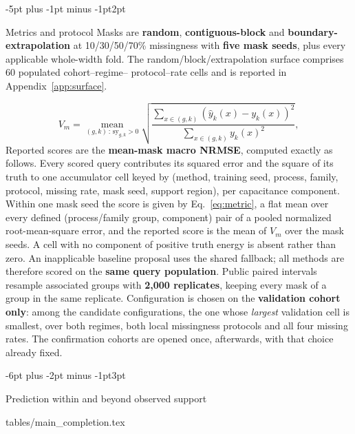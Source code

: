 \documentclass{article}
\makeatletter
\renewcommand{\subsection}{\@startsection{subsection}{2}{\z@}
  {-6pt plus -2pt minus -1pt}{3pt}{\normalsize\sc\raggedright}}
\renewcommand{\subsubsection}{\@startsection{subsubsection}{3}{\z@}
  {-5pt plus -1pt minus -1pt}{2pt}{\normalsize\sc\raggedright}}
\newcommand{\tabdir}{tables}
\newcommand{\tableinput}[1]{\@@input \tabdir/#1 }
\makeatother
\begin{document}
\subsubsection{Metrics and protocol}
\label{sec:metrics}
Masks are \textbf{random}, \textbf{contiguous-block} and \textbf{boundary-extrapolation} at 10/30/50/70\%
missingness with \textbf{five mask seeds}, plus every applicable whole-width fold. The
random/block/extrapolation surface comprises 60 populated cohort--regime--
protocol--rate cells and is reported in Appendix~\ref{app:surface}.

\begin{equation}
\label{eq:metric}
V_m = \operatorname*{mean}_{(g,k)\,:\,\mathrm{sy}_{g,k} > 0}
\sqrt{\frac{\sum_{x \in (g,k)} (\hat y_k(x) - y_k(x))^2}
            {\sum_{x \in (g,k)} y_k(x)^2}},
\end{equation}
Reported scores are the \textbf{mean-mask macro NRMSE}, computed exactly as follows.
Every scored query contributes its squared error and the square of its truth to
one accumulator cell keyed by (method, training seed, process, family, protocol,
missing rate, mask seed, support region), per capacitance component. Within one
mask seed the score is given by Eq.~\eqref{eq:metric},
a flat mean over every defined (process/family group, component) pair of a
pooled normalized root-mean-square error, and the reported score is the mean of
$V_m$ over the mask seeds. A cell with no component of positive truth energy is
absent rather than zero. An inapplicable baseline proposal uses the shared fallback; all methods
are therefore scored on the \textbf{same query population}. Public paired intervals resample associated
groups with \textbf{2{,}000 replicates}, keeping every mask of a group in the same
replicate.
Configuration is chosen on the \textbf{validation cohort only}: among the candidate
configurations, the one whose \emph{largest} validation cell is smallest, over
both regimes, both local missingness protocols and all four missing rates. The
confirmation cohorts are opened once, afterwards, with that choice already
fixed.

\subsection{Prediction within and beyond observed support}
\label{sec:intable}
\label{sec:outtable}

\begin{table}[t]
\centering
\caption{\textbf{Capacitance prediction at 30\% missingness.}
Mean-mask macro NRMSE ($\downarrow$); bold: best method.
CMI: 1D for public rules, 2D for FEM. Rnd./Ext.: random/boundary extrapolation.}
\label{tab:completion}\label{tab:intable}\label{tab:intable2d}\label{tab:outtable1d}
\tableinput{main_completion.tex}
\end{table}
\end{document}
